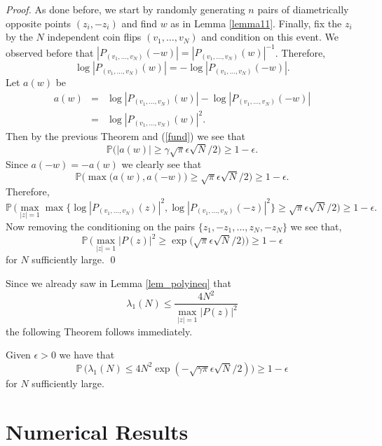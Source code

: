 \documentclass[smallextended]{svjour3}
\begin{document}
\begin{proof}
As done before, we start by randomly generating $n$ pairs of diametrically opposite points $(z_{i},-z_{i})$ and find $w$ as in Lemma \ref{lemma11}. Finally, fix the $z_i$ by the $N$ independent coin flips $(v_{1},\ldots,v_{N})$ and condition on this event. We observed before that $|P_{(v_1,\ldots,v_N)}(-w)|=|P_{(v_1,\ldots,v_N)}(w)|^{-1}$. Therefore,
$$
\log|P_{(v_1,\ldots,v_N)}(w)|=-\log|P_{(v_1,\ldots,v_N)}(-w)|.
$$
Let $a(w)$ be 
\begin{eqnarray*}
a(w) & = & \log|P_{(v_1,\ldots,v_N)}(w)|-\log|P_{(v_1,\ldots,v_N)}(-w)|\\
& = & \log|P_{(v_1,\ldots,v_N)}(w)|^2.
\end{eqnarray*}
Then by the previous Theorem and (\ref{fund}) we see that
$$
\mathbb{P}\Big(|a(w)| \geq \gamma\sqrt{\pi}\epsilon\sqrt{N}/2\Big)\geq 1-\epsilon.
$$
Since $a(-w)=-a(w)$ we clearly see that
$$
\mathbb{P}\big(\max\big(a(w),a(-w)\big)\geq \sqrt{\pi}\epsilon\sqrt{N}/2\big)\geq 1-\epsilon.
$$
Therefore, 
\begin{equation}
\mathbb{P}\,\Big(\max_{|z|=1}{\max \{\log|P_{(v_1,\ldots,v_N)}(z)|^2,\log|P_{(v_1,\ldots,v_N)}(-z)|^2 \} } \geq \sqrt{\pi}\epsilon\sqrt{N}/2\Big) \geq 1-\epsilon. 
\end{equation}
Now removing the conditioning on the pairs $\{z_1,-z_1,\ldots,z_N,-z_N\}$ we see that,
\begin{equation}
\mathbb{P}\,\Bigg(\max_{|z|=1}|P(z)|^2\geq \exp\big(\sqrt{\pi}\epsilon\sqrt{N}/2\big)\Bigg)\geq 1-\epsilon
\end{equation}
for $N$ sufficiently large.
\qed \end{proof}
Since we already saw in Lemma \ref{lem_polyineq} that
$$
\lambda_{1}(N)\leq \frac{4N^2}{\max_{|z|=1}|P(z)|^2}
$$
the following Theorem follows immediately.

\begin{theorem}\label{main_comb}
Given $\epsilon>0$ we have that
\begin{equation}
\mathbb{P}\,\Big(\lambda_1(N)\leq 4N^2\exp(-\sqrt{\gamma \pi}\epsilon\sqrt{N}/2)\Big)\geq 1-\epsilon
\end{equation}
for $N$ sufficiently large.
\end{theorem}

\section{Numerical Results}\label{sec_numer}
\end{document}
